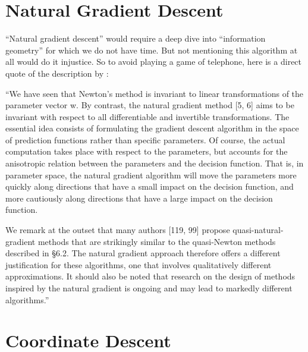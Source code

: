 \section{Natural Gradient Descent}

``Natural gradient descent'' would require a deep dive into ``information geometry''
for which we do not have time. But not mentioning this algorithm at all would do it
injustice. So to avoid playing a game of telephone, here is a direct quote of
the description by \textcite{bottouOptimizationMethodsLargeScale2018}:

``We have seen that Newton's method is invariant to linear transformations of
the parameter vector w. By contrast, the natural gradient method [5, 6] aims to
be invariant with respect to all differentiable and invertible transformations.
The essential idea consists of formulating the gradient descent algorithm in the
space of prediction functions rather than specific parameters. Of course, the
actual computation takes place with respect to the parameters, but accounts for
the anisotropic relation between the parameters and the decision function. That
is, in parameter space, the natural gradient algorithm will move the parameters
more quickly along directions that have a small impact on the decision function,
and more cautiously along directions that have a large impact on the decision
function.

We remark at the outset that many authors [119, 99] propose
quasi-natural-gradient methods that are strikingly similar to the quasi-Newton
methods described in §6.2. The natural gradient approach therefore offers a
different justification for these algorithms, one that involves qualitatively
different approximations. It should also be noted that research on the design of
methods inspired by the natural gradient is ongoing and may lead to markedly
different algorithms.''

\section{Coordinate Descent}

